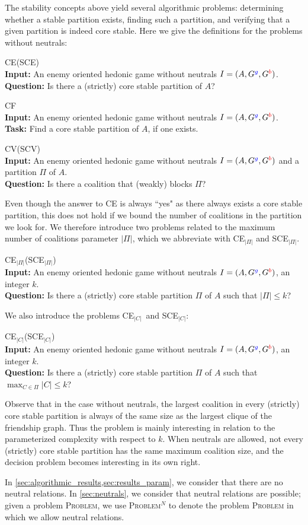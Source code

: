 \documentclass[a4paper,fleqn]{cas-sc}
\newcommand{\friendshipColor}{blue}
\newcommand{\enemyColor}{red}
\newcommand{\agentSet}{\ensuremath{A}\xspace}
\newcommand{\partition}{\ensuremath{\Pi}\xspace}
\newcommand{\coalition}{\ensuremath{C}\xspace}
\newcommand{\friendSuperscript}{{\color{\friendshipColor}g}}
\newcommand{\enemySuperscript}{{\color{\enemyColor}b}}
\newcommand{\friendshipGraph}{\ensuremath{G^{\friendSuperscript}}\xspace}
\newcommand{\enemyGraph}{\ensuremath{G^{\enemySuperscript}}\xspace}
\newcommand{\decprob}[3]{
  \begin{center}    \begin{minipage}{0.94\linewidth}      \textsc{#1}\\[0.2ex]
      \textbf{Input:} #2\\[0.2ex]
      \textbf{Question:} #3
    \end{minipage}  \end{center}
}
\newcommand{\probname}[1]{\textsc{#1}}
\newcommand{\optprob}[3]{
  \begin{center}    \begin{minipage}{0.94\linewidth}      \textsc{#1}\\[0.2ex]
      \textbf{Input:} #2\\[0.2ex]
      \textbf{Task:} #3
    \end{minipage}  \end{center} 
}
\newcommand{\CE}{CE\xspace}
\newcommand{\SCE}{SCE\xspace}
\newcommand{\CEBounded}{CE$_{\maxNumberOfCoalitions}$\xspace}
\newcommand{\SCEBounded}{SCE$_{\maxNumberOfCoalitions}$\xspace}
\newcommand{\CEBoundedCoal}{CE$_{\maxCoalitionSize}$\xspace}
\newcommand{\SCEBoundedCoal}{SCE$_{\maxCoalitionSize}$\xspace}
\newcommand{\SCV}{SCV\xspace}
\newcommand{\CF}{CF\xspace}
\newcommand{\CV}{CV\xspace}
\newcommand{\neut}[1]{#1\unskip$^{N}$}
\newcommand{\maxCoalitionSize}{\ensuremath{|\coalition|}\xspace}
\newcommand{\maxNumberOfCoalitions}{\ensuremath{|\partition|}\xspace}
\begin{document}
The stability concepts above yield several algorithmic problems: determining whether a stable partition exists, finding such a partition, and verifying that a given partition is indeed core stable. Here we give the definitions for the problems without neutrals: 

\decprob{\CE (\SCE)}{An enemy oriented hedonic game without neutrals $I=(\agentSet,\friendshipGraph,\enemyGraph)$.}{Is there a (strictly) core stable partition of \agentSet?}

\optprob{\CF}{An enemy oriented hedonic game without neutrals $I=(\agentSet,\friendshipGraph,\enemyGraph)$.}{Find a core stable partition of \agentSet, if one exists.}

\decprob{\CV (\SCV)}{An enemy oriented hedonic game without neutrals $I=(\agentSet,\friendshipGraph,\enemyGraph)$ and a partition \partition of \agentSet.}{Is there a coalition that (weakly) blocks \partition?}

 Even though the answer to \CE is always ``yes" as there always exists a core stable partition, this does not hold if we bound the number of coalitions in the partition we look for. We therefore introduce two problems related to the maximum number of coalitions parameter \maxNumberOfCoalitions, which we abbreviate with \CEBounded and \SCEBounded.

\decprob{\CEBounded (\SCEBounded)}{An enemy oriented hedonic game without neutrals $I=(\agentSet,\friendshipGraph,\enemyGraph)$, an integer $k$.}{Is there a (strictly) core stable partition \partition of \agentSet such that $|\partition| \leq k$?}

We also introduce the problems \CEBoundedCoal\ and \SCEBoundedCoal:
\decprob{\CEBoundedCoal  (\SCEBoundedCoal)}{An enemy oriented hedonic game without neutrals $I=(\agentSet,\friendshipGraph,\enemyGraph)$, an integer $k$.}{Is there a (strictly) core stable partition \partition of \agentSet such that $\max_{\coalition \in \partition}|\coalition| \leq k$?}
Observe that in the case without neutrals, the largest coalition in every (strictly) core stable partition is always of the same size as the largest clique of the friendship graph.
Thus the problem is mainly interesting in relation to the parameterized complexity with respect to $k$.
When neutrals are allowed, not every (strictly) core stable partition has the same maximum coalition size, and the decision problem becomes interesting in its own right.



In \cref{sec:algorithmic_results,sec:results_param}, we consider that there are no neutral relations. In \cref{sec:neutrals}, we consider that neutral relations are possible; given a problem \probname{Problem}, we use \neut{\probname{Problem}} to denote the problem \probname{Problem} in which we allow neutral relations. 
\end{document}
